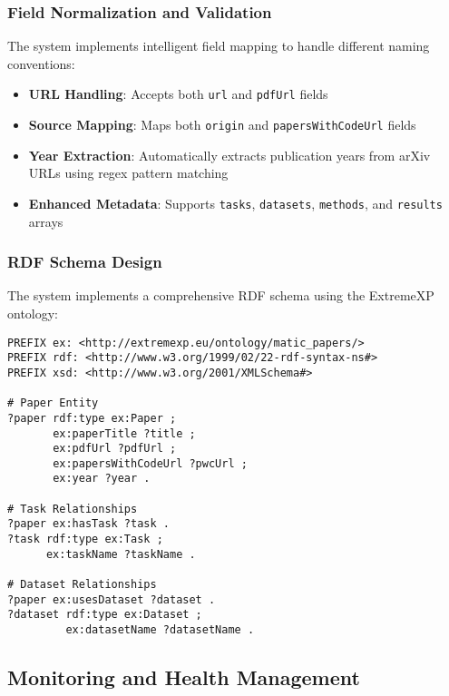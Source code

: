 \documentclass[12pt,a4paper]{article}
\begin{document}
\subsubsection{Field Normalization and Validation}

The system implements intelligent field mapping to handle different naming conventions:

\begin{itemize}
    \item \textbf{URL Handling}: Accepts both \texttt{url} and \texttt{pdfUrl} fields
    \item \textbf{Source Mapping}: Maps both \texttt{origin} and \texttt{papersWithCodeUrl} fields
    \item \textbf{Year Extraction}: Automatically extracts publication years from arXiv URLs using regex pattern matching
    \item \textbf{Enhanced Metadata}: Supports \texttt{tasks}, \texttt{datasets}, \texttt{methods}, and \texttt{results} arrays
\end{itemize}

\subsubsection{RDF Schema Design}

The system implements a comprehensive RDF schema using the ExtremeXP ontology:

\begin{lstlisting}[language=sparql,caption=RDF Schema Example]
PREFIX ex: <http://extremexp.eu/ontology/matic_papers/>
PREFIX rdf: <http://www.w3.org/1999/02/22-rdf-syntax-ns#>
PREFIX xsd: <http://www.w3.org/2001/XMLSchema#>

# Paper Entity
?paper rdf:type ex:Paper ;
       ex:paperTitle ?title ;
       ex:pdfUrl ?pdfUrl ;
       ex:papersWithCodeUrl ?pwcUrl ;
       ex:year ?year .

# Task Relationships
?paper ex:hasTask ?task .
?task rdf:type ex:Task ;
      ex:taskName ?taskName .

# Dataset Relationships  
?paper ex:usesDataset ?dataset .
?dataset rdf:type ex:Dataset ;
         ex:datasetName ?datasetName .
\end{lstlisting}

\subsection{Monitoring and Health Management}
\end{document}
